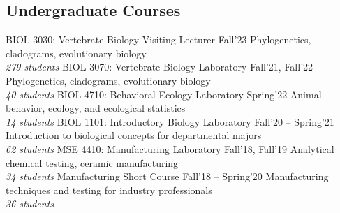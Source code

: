 \subsection{Undergraduate Courses}
    \begin{cvtable}
        {BIOL 3030: Vertebrate Biology Visiting Lecturer}
        {Fall'23}
        {Phylogenetics, cladograms, evolutionary biology\\ 
            \textit{279 students}}
        \cvitem{}
        {BIOL 3070: Vertebrate Biology Laboratory}
        {Fall'21, Fall'22}
        {Phylogenetics, cladograms, evolutionary biology\\ 
            \textit{40 students}}
        \cvitem{}
        {BIOL 4710: Behavioral Ecology Laboratory}
        {Spring'22}
        {Animal behavior, ecology, and ecological statistics\\ 
            \textit{14 students}}
        \cvitem{}
        {BIOL 1101: Introductory Biology Laboratory}
        {Fall'20 -- Spring'21}
        {Introduction to biological concepts for departmental majors\\
            \textit{62 students}}
        {MSE 4410: Manufacturing Laboratory}
        {Fall'18, Fall'19}
        {Analytical chemical testing, ceramic manufacturing\\
            \textit{34 students}}
        \cvitem{}
        {Manufacturing Short Course}
        {Fall'18 -- Spring'20}
        {Manufacturing techniques and testing for industry professionals\\
            \textit{36 students}}
    \end{cvtable}